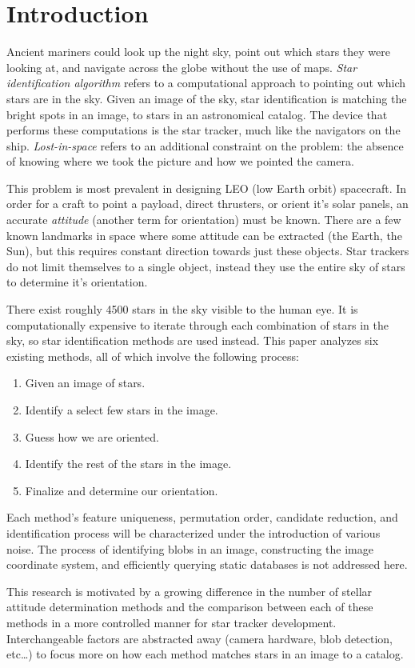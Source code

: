 \section{Introduction}\label{sec:introduction}
Ancient mariners could look up the night sky, point out which stars they were looking at, and navigate across the globe
without the use of maps.
\textit{Star identification algorithm} refers to a computational approach to pointing out which stars
are in the sky.
Given an image of the sky, star identification is matching the bright spots in an image, to stars in an astronomical
catalog.
The device that performs these computations is the star tracker, much like the navigators on the ship.
\textit{Lost-in-space} refers to an additional constraint on the problem: the absence of knowing where we took
the picture and how we pointed the camera.

This problem is most prevalent in designing LEO (low Earth orbit) spacecraft.
In order for a craft to point a payload, direct thrusters, or orient it's solar panels, an accurate
\textit{attitude} (another term for orientation) must be known.
There are a few known landmarks in space where some attitude can be extracted (the Earth, the Sun), but this
requires constant direction towards just these objects.
Star trackers do not limit themselves to a single object, instead they use the entire sky of stars to determine it's
orientation.

There exist roughly 4500 stars in the sky visible to the human eye.
It is computationally expensive to iterate through each combination of stars in the sky, so star identification methods
are used instead.
This paper analyzes six existing methods, all of which involve the following process:
\begin{enumerate}
    \item Given an image of stars.
    \item Identify a select few stars in the image.
    \item Guess how we are oriented.
    \item Identify the rest of the stars in the image.
    \item Finalize and determine our orientation.
\end{enumerate}

Each method's feature uniqueness, permutation order, candidate reduction, and identification process will be
characterized under the introduction of various noise.
The process of identifying blobs in an image, constructing the image coordinate system, and efficiently querying
static databases is not addressed here.

This research is motivated by a growing difference in the number of stellar attitude determination methods and the
comparison between each of these methods in a more controlled manner for star tracker development.
Interchangeable factors are abstracted away (camera hardware, blob detection, etc\ldots) to focus more on how each
method matches stars in an image to a catalog.
